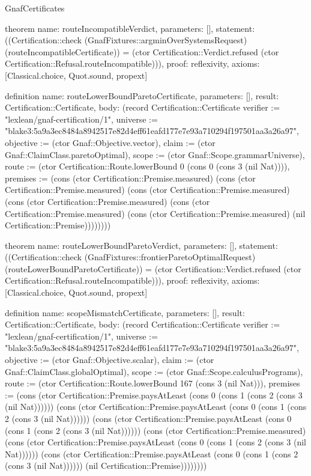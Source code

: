 \begin{lexlean}{GnafCertificates}
\begin{semanticmodule}
theorem{
  name: routeIncompatibleVerdict,
  parameters: [],
  statement: ((Certification::check (GnafFixtures::argminOverSystemsRequest) (routeIncompatibleCertificate)) = (ctor Certification::Verdict.refused (ctor Certification::Refusal.routeIncompatible))),
  proof: reflexivity{},
  axioms: [Classical.choice, Quot.sound, propext]
}

definition{
  name: routeLowerBoundParetoCertificate,
  parameters: [],
  result: Certification::Certificate,
  body: (record Certification::Certificate {verifier := "lexlean/gnaf-certification/1", universe := "blake3:5a9a3ec8484a8942517e82d4eff61eafd177e7e93a710294f197501aa3a26a97", objective := (ctor Gnaf::Objective.vector), claim := (ctor Gnaf::ClaimClass.paretoOptimal), scope := (ctor Gnaf::Scope.grammarUniverse), route := (ctor Certification::Route.lowerBound 0 (cons 0 (cons 3 (nil Nat)))), premises := (cons (ctor Certification::Premise.measured) (cons (ctor Certification::Premise.measured) (cons (ctor Certification::Premise.measured) (cons (ctor Certification::Premise.measured) (cons (ctor Certification::Premise.measured) (cons (ctor Certification::Premise.measured) (nil Certification::Premise)))))))})
}

theorem{
  name: routeLowerBoundParetoVerdict,
  parameters: [],
  statement: ((Certification::check (GnafFixtures::frontierParetoOptimalRequest) (routeLowerBoundParetoCertificate)) = (ctor Certification::Verdict.refused (ctor Certification::Refusal.routeIncompatible))),
  proof: reflexivity{},
  axioms: [Classical.choice, Quot.sound, propext]
}

definition{
  name: scopeMismatchCertificate,
  parameters: [],
  result: Certification::Certificate,
  body: (record Certification::Certificate {verifier := "lexlean/gnaf-certification/1", universe := "blake3:5a9a3ec8484a8942517e82d4eff61eafd177e7e93a710294f197501aa3a26a97", objective := (ctor Gnaf::Objective.scalar), claim := (ctor Gnaf::ClaimClass.globalOptimal), scope := (ctor Gnaf::Scope.calculusPrograms), route := (ctor Certification::Route.lowerBound 167 (cons 3 (nil Nat))), premises := (cons (ctor Certification::Premise.paysAtLeast (cons 0 (cons 1 (cons 2 (cons 3 (nil Nat)))))) (cons (ctor Certification::Premise.paysAtLeast (cons 0 (cons 1 (cons 2 (cons 3 (nil Nat)))))) (cons (ctor Certification::Premise.paysAtLeast (cons 0 (cons 1 (cons 2 (cons 3 (nil Nat)))))) (cons (ctor Certification::Premise.measured) (cons (ctor Certification::Premise.paysAtLeast (cons 0 (cons 1 (cons 2 (cons 3 (nil Nat)))))) (cons (ctor Certification::Premise.paysAtLeast (cons 0 (cons 1 (cons 2 (cons 3 (nil Nat)))))) (nil Certification::Premise)))))))})
}


\end{semanticmodule}
\end{lexlean}
